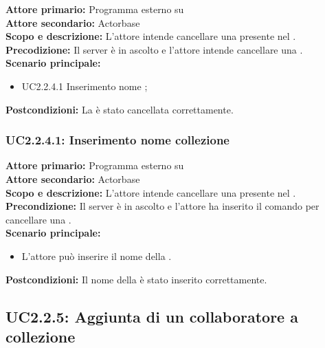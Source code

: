 \documentclass{scalatekids-article}
\begin{document}
\textbf{Attore primario:} Programma esterno su \\
\textbf{Attore secondario:} Actorbase\\
\textbf{Scopo e descrizione:} L'attore intende cancellare una  presente nel .\\
\textbf{Precodizione:} Il server è in ascolto e l'attore intende cancellare una .\\
\textbf{Scenario principale:}
\begin{itemize}
\item UC2.2.4.1 Inserimento nome ;
\end{itemize}
\textbf{Postcondizioni:} La  è stato cancellata correttamente.

\subsubsection{UC2.2.4.1: Inserimento nome collezione}

\textbf{Attore primario:} Programma esterno su \\
\textbf{Attore secondario:} Actorbase\\
\textbf{Scopo e descrizione:} L'attore intende cancellare una  presente nel .\\
\textbf{Precondizione:} Il server è in ascolto e l'attore ha inserito il comando per cancellare una .\\
\textbf{Scenario principale:}
\begin{itemize}
\item L'attore può inserire il nome della .
\end{itemize}
\textbf{Postcondizioni:} Il nome della  è stato inserito correttamente.

\subsection{UC2.2.5: Aggiunta di un collaboratore a collezione}
\end{document}
